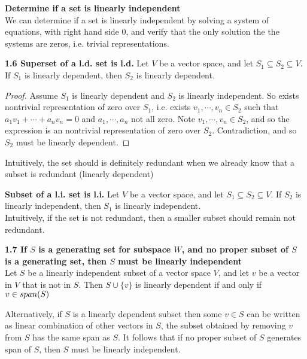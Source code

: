 \documentclass[11pt]{article}
\begin{document}
\begin{defn*}
    \textbf{Determine if a set is linearly independent} \\ 
    We can determine if a set is linearly independent by solving a system of equations, with right hand side 0, and verify that the only solution the the systems are zeros, i.e. trivial representations. 
\end{defn*}


\begin{theorem*}
    \textbf{1.6 Superset of a l.d. set is l.d.} Let $V$ be a vector space, and let $S_1 \subseteq S_2 \subseteq V$. If $S_1$ is linearly dependent, then $S_2$ is linearly dependent.
    \begin{proof}
        Assume $S_1$ is linearly dependent and $S_2$ is linearly independent. So exists nontrivial representation of zero over $S_1$, i.e. exists $v_1, \cdots, v_n \in S_2$ such that $a_1v_1 + \cdots + a_nv_n = 0$ and $a_1,\cdots, a_n$ not all zero. Note $v_1, \cdots, v_n \in S_2$, and so the expression is an nontrivial representation of zero over $S_2$. Contradiction, and so $S_2$ must be linearly dependent. 
    \end{proof}
    Intuitively, the set should is definitely redundant when we already know that a subset is redundant (linearly dependent)
\end{theorem*}


\begin{corollary*}
    \textbf{Subset of a l.i. set is l.i.} Let $V$ be a vector space, and let $S_1 \subseteq S_2 \subseteq V$. If $S_2$ is linearly independent, then $S_1$ is linearly independent. \\
    Intuitively, if the set is not redundant, then a smaller subset should remain not redundant.
\end{corollary*}


\begin{theorem*}
    \textbf{1.7 If $S$ is a generating set for subspace $W$, and no proper subset of $S$ is a generating set, then $S$ must be linearly independent} \\
    Let $S$ be a linearly independent subset of a vector space $V$, and let $v$ be a vector in $V$ that is not in $S$. Then $S\cup \{ v\}$ is linearly dependent if and only if $v\in span(S)$ 
    \begin{rem}
        Alternatively, if $S$ is a linearly dependent subset then some $v\in S$ can be written as linear combination of other vectors in $S$, the subset obtained by removing $v$ from $S$ has the same span as $S$. It follows that if no proper subset of $S$ generates span of $S$, then $S$ must be linearly independent. 
    \end{rem}
\end{theorem*}
\end{document}
